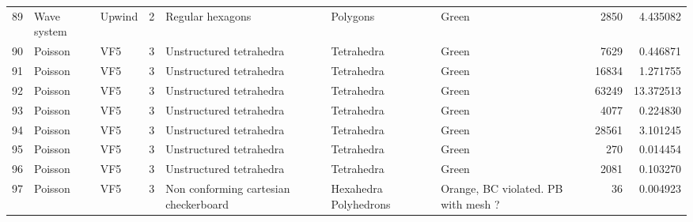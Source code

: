 \begin{tabular}{lllrlllrr}
89  &       Wave system &                         Upwind &               2 &                          Regular hexagons &               Polygons  &                                Green &                     2850 &                         4.435082 \\
90  &           Poisson &                            VF5 &               3 &                   Unstructured tetrahedra &             Tetrahedra  &                                Green &                     7629 &                         0.446871 \\
91  &           Poisson &                            VF5 &               3 &                   Unstructured tetrahedra &             Tetrahedra  &                                Green &                    16834 &                         1.271755 \\
92  &           Poisson &                            VF5 &               3 &                   Unstructured tetrahedra &             Tetrahedra  &                                Green &                    63249 &                        13.372513 \\
93  &           Poisson &                            VF5 &               3 &                   Unstructured tetrahedra &             Tetrahedra  &                                Green &                     4077 &                         0.224830 \\
94  &           Poisson &                            VF5 &               3 &                   Unstructured tetrahedra &             Tetrahedra  &                                Green &                    28561 &                         3.101245 \\
95  &           Poisson &                            VF5 &               3 &                   Unstructured tetrahedra &             Tetrahedra  &                                Green &                      270 &                         0.014454 \\
96  &           Poisson &                            VF5 &               3 &                   Unstructured tetrahedra &             Tetrahedra  &                                Green &                     2081 &                         0.103270 \\
97  &           Poisson &                            VF5 &               3 &     Non conforming cartesian checkerboard &  Hexahedra Polyhedrons  &  Orange, BC violated. PB with mesh ? &                       36 &                         0.004923 \\

\end{tabular}
